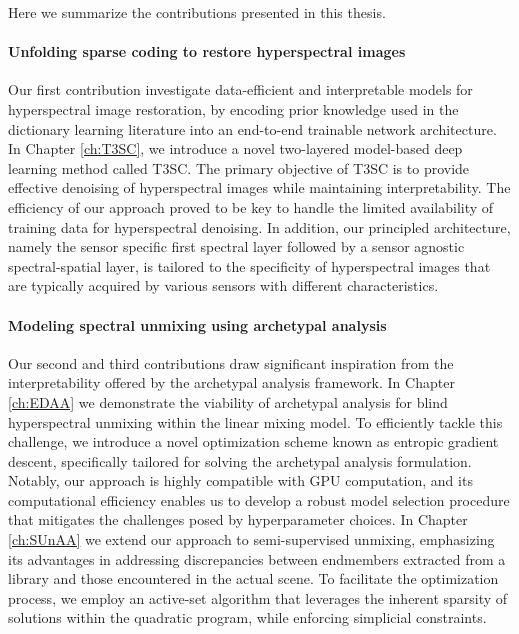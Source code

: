 Here we summarize the contributions presented in this thesis.

\paragraph{Unfolding sparse coding to restore hyperspectral images}

Our first contribution investigate data-efficient and interpretable models for hyperspectral image restoration, by encoding prior knowledge used in the dictionary learning literature into an end-to-end trainable network architecture.
In Chapter \ref{ch:T3SC}, we introduce a novel two-layered model-based deep learning method called T3SC. 
The primary objective of T3SC is to provide effective denoising of hyperspectral images while maintaining interpretability.
The efficiency of our approach proved to be key to handle the limited availability of training data for hyperspectral denoising.
In addition, our principled architecture, namely the sensor specific first spectral layer followed by a sensor agnostic spectral-spatial layer, is tailored to the specificity of hyperspectral images that are typically acquired by various sensors with different characteristics.

\paragraph{Modeling spectral unmixing using archetypal analysis}

Our second and third contributions draw significant inspiration from the interpretability offered by the archetypal analysis framework.
In Chapter \ref{ch:EDAA} we demonstrate the viability of archetypal analysis for blind hyperspectral unmixing within the linear mixing model.
To efficiently tackle this challenge, we introduce a novel optimization scheme known as entropic gradient descent, specifically tailored for solving the archetypal analysis formulation.
Notably, our approach is highly compatible with GPU computation, and its computational efficiency enables us to develop a robust model selection procedure that mitigates the challenges posed by hyperparameter choices.
In Chapter \ref{ch:SUnAA} we extend our approach to semi-supervised unmixing, emphasizing its advantages in addressing discrepancies between endmembers extracted from a library and those encountered in the actual scene.
To facilitate the optimization process, we employ an active-set algorithm that leverages the inherent sparsity of solutions within the quadratic program, while enforcing simplicial constraints.


